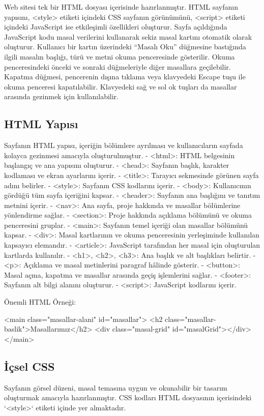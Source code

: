 \documentclass[12pt,a4paper]{article}
\begin{document}
Web sitesi tek bir HTML dosyası içerisinde hazırlanmıştır. HTML sayfanın yapısını, <style> etiketi içindeki CSS sayfanın görünümünü, <script> etiketi içindeki JavaScript ise etkileşimli özellikleri oluşturur. Sayfa açıldığında JavaScript kodu masal verilerini kullanarak sekiz masal kartını otomatik olarak oluşturur. Kullanıcı bir kartın üzerindeki “Masalı Oku” düğmesine bastığında ilgili masalın başlığı, türü ve metni okuma penceresinde gösterilir. Okuma penceresindeki önceki ve sonraki düğmeleriyle diğer masallara geçilebilir. Kapatma düğmesi, pencerenin dışına tıklama veya klavyedeki Escape tuşu ile okuma penceresi kapatılabilir. Klavyedeki sağ ve sol ok tuşları da masallar arasında gezinmek için kullanılabilir.

\subsection{HTML Yapısı}
Sayfanın HTML yapısı, içeriğin bölümlere ayrılması ve kullanıcıların sayfada kolayca gezinmesi amacıyla oluşturulmuştur.
- <html>: HTML belgesinin başlangıç ve ana yapısını oluşturur.
- <head>: Sayfanın başlık, karakter kodlaması ve ekran ayarlarını içerir.
- <title>: Tarayıcı sekmesinde görünen sayfa adını belirler.
- <style>: Sayfanın CSS kodlarını içerir.
- <body>: Kullanıcının gördüğü tüm sayfa içeriğini kapsar.
- <header>: Sayfanın ana başlığını ve tanıtım metnini içerir.
- <nav>: Ana sayfa, proje hakkında ve masallar bölümlerine yönlendirme sağlar.
- <section>: Proje hakkında açıklama bölümünü ve okuma penceresini gruplar.
- <main>: Sayfanın temel içeriği olan masallar bölümünü kapsar.
- <div>: Masal kartlarının ve okuma penceresinin yerleşiminde kullanılan kapsayıcı elemandır.
- <article>: JavaScript tarafından her masal için oluşturulan kartlarda kullanılır.
- <h1>, <h2>, <h3>: Ana başlık ve alt başlıkları belirtir.
- <p>: Açıklama ve masal metinlerini paragraf hâlinde gösterir.
- <button>: Masal açma, kapatma ve masallar arasında geçiş işlemlerini sağlar.
- <footer>: Sayfanın alt bilgi alanını oluşturur.
- <script>: JavaScript kodlarını içerir.

Önemli HTML Örneği:

<main class="masallar-alani" id="masallar">
  <h2 class="masallar-baslik">Masallarımız</h2>
  <div class="masal-grid" id="masalGrid"></div>
</main>

\subsection{İçsel CSS}
Sayfanın görsel düzeni, masal temasına uygun ve okunabilir bir tasarım oluşturmak amacıyla hazırlanmıştır. CSS kodları HTML dosyasının içerisindeki `<style>` etiketi içinde yer almaktadır.
\end{document}
